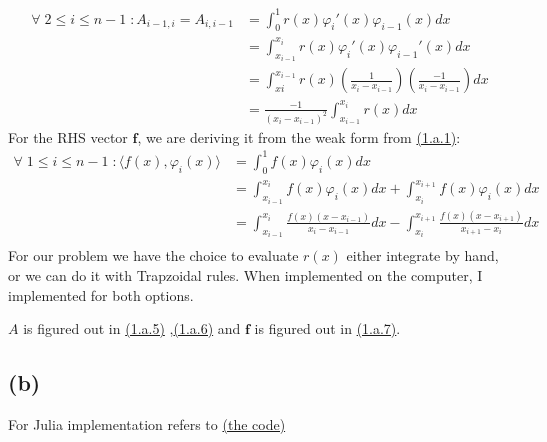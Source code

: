 \documentclass[]{article}
\begin{document}
        \begin{align*}\tag{1.a.6}\label{eqn:1.a.6}
            \forall\; 2 \le i \le n - 1 \; :
            A_{i - 1, i} = A_{i, i - 1} 
            &= 
            \int_{0}^{1} 
                r(x)\varphi_i'(x)\varphi_{i- 1}(x)
            dx
            \\
            &= 
                \int_{x_{i - 1 }}^{x_i} 
                    r(x)\varphi_i'(x)\varphi_{i - 1}'(x)
                dx
            \\
            &= 
            \int_{x{i}}^{x_{i - 1}} 
                r(x)
                \left(
                    \frac{1}{x_i - x_{i - 1}}
                \right)
                \left(
                    \frac{-1}{x_i - x_{i - 1}}
                \right)
            dx
            \\
            &= 
            \frac{-1}{(x_i - x_{i - 1})^2}
            \int_{x_{i - 1}}^{x_i} 
                r(x)
            dx
        \end{align*}
        For the RHS vector $\mathbf{f}$, we are deriving it from the weak form from \hyperref[eqn:1.a.1]{(1.a.1)}: 
        \begin{align*}\tag{1.a.7}\label{eqn:1.a.7}
            \forall\; 1 \le i \le n - 1\;: 
            \langle f(x), \varphi_i(x)\rangle
            &= 
            \int_{0}^{1} 
                f(x)\varphi_i(x)
            dx
            \\
            &= \int_{x_{i - 1}}^{x_i} 
                f(x)\varphi_i(x)
            dx + 
            \int_{x_i}^{x_{i + 1}} 
                f(x)\varphi_i(x)
            dx
            \\
            &= 
            \int_{x_{i - 1}}^{x_i} 
                \frac{f(x)(x - x_{i - 1})}{x_i - x_{i - 1}}
            dx - 
            \int_{x_i}^{x_{i + 1}}
                \frac{f(x)(x - x_{i + 1})}{x_{i + 1} - x_i}
            dx
            \\
        \end{align*}
        For our problem we have the choice to evaluate $r(x)$ either integrate by hand, or we can do it with Trapzoidal rules. When implemented on the computer, I implemented for both options. 
        \par
        $A$ is figured out in \hyperref[eqn:1.a.5]{(1.a.5)} ,\hyperref[eqn:1.a.5]{(1.a.6)} and $\mathbf{f}$ is figured out in \hyperref[eqn:1.a.7]{(1.a.7)}. 
    \subsection*{(b)}
        For Julia implementation refers to \hyperref[THECODE]{(the code)}
\end{document}
